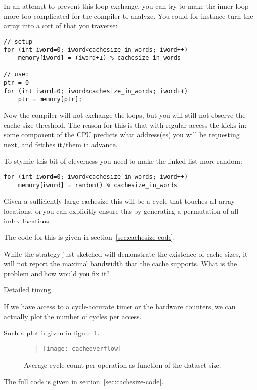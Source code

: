 In an attempt to prevent this loop exchange,
you can try to make the inner loop more too complicated
for the compiler to analyze.
You could for instance turn the array into a sort of 
that you traverse:
\begin{lstlisting}
// setup
for (int iword=0; iword<cachesize_in_words; iword++)
    memory[iword] = (iword+1) % cachesize_in_words

// use:
ptr = 0
for (int iword=0; iword<cachesize_in_words; iword++)
    ptr = memory[ptr];
\end{lstlisting}
Now the compiler will not exchange the loops, but you will still not
observe the cache size threshold.
The reason for this is that with regular access the 
kicks in:
some component of the CPU predicts what address(es) you will be requesting next,
and fetches it/them in advance.

To stymie this bit of cleverness you need to make the linked list more random:
\begin{lstlisting}
for (int iword=0; iword<cachesize_in_words; iword++)
    memory[iword] = random() % cachesize_in_words
\end{lstlisting}
Given a sufficiently large cachesize this will be a cycle
that touches all array locations,
or you can explicitly ensure this by generating a permutation of all index locations.

The code for this is given in section~\ref{sec:cachesize-code}.

\begin{exercise}
  While the strategy just sketched will demonstrate the existence of cache sizes,
  it will not report the maximal bandwidth that the cache supports.
  What is the problem and how would you fix it?
\end{exercise}

 {Detailed timing}

If we have access to a cycle-accurate timer or the hardware counters,
we can actually plot the number of cycles per access.

Such a plot is given in figure~\ref{fig:cache-overflow}.
\begin{figure}[ht]
  \begin{quote}
  \texttt{[image: cacheoverflow]}
  \end{quote}
  \caption{Average cycle count per operation as function of the
    dataset size.}
  \label{fig:cache-overflow}
\end{figure}
The full code is given in section~\ref{sec:cachesize-code}.

